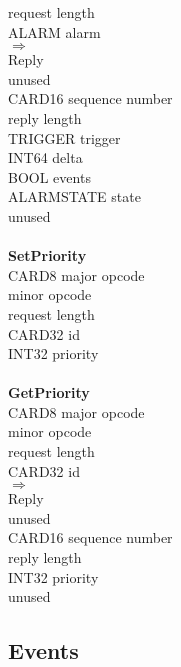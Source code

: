 \begin{tabbing}
	\> 2			\> request length \\
		\> ALARM	\> alarm \\
$\Rightarrow$\\
	\> 1			\> Reply \\
		\>		\> unused \\
		\> CARD16	\> sequence number \\
				\> reply length \\
		\> TRIGGER	\> trigger \\
		\> INT64	\> delta \\
		\> BOOL		\> events \\
		\> ALARMSTATE	\> state \\
		\>		\> unused \\
\\
{\bf SetPriority}\\
		\> CARD8	\> major opcode \\
	\> 1			\> minor opcode \\
				\> request length \\
		\> CARD32	\> id \\
		\> INT32	\> priority \\
\\
{\bf GetPriority}\\
		\> CARD8	\> major opcode \\
	\> 1			\> minor opcode \\
				\> request length \\
		\> CARD32	\> id \\
$\Rightarrow$\\
	\> 1			\> Reply \\
		\>		\> unused \\
		\> CARD16	\> sequence number \\
				\> reply length \\
		\> INT32	\> priority \\
		\>		\> unused\\
\end{tabbing}

\subsection*{Events}

